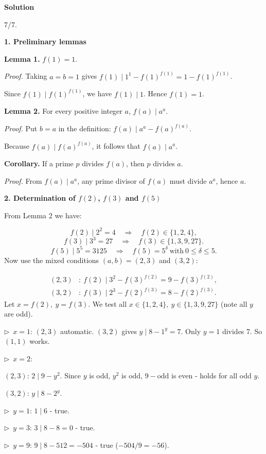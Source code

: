\documentclass{llmxive}
\providecommand{\solutionheading}[1]{\par\smallskip\noindent\textbf{#1}\par}
\providecommand{\compactbullet}[1]{\par\noindent$\triangleright$~#1\par}
\begin{document}
\solutionheading{Solution}
\begin{remark*}
  7/7.
\end{remark*}
\solutionheading{1. Preliminary lemmas}
\textbf{Lemma 1.} \(f(1)=1\).\par
\emph{Proof.} Taking \(a=b=1\) gives \(f(1)\mid 1^{1}-f(1)^{f(1)}=1-f(1)^{f(1)}\).\par
Since \(f(1)\mid f(1)^{f(1)}\), we have \(f(1)\mid 1\). Hence \(f(1)=1\).\par
\textbf{Lemma 2.} For every positive integer \(a\), \(f(a)\mid a^{a}\).\par
\emph{Proof.} Put \(b=a\) in the definition: \(f(a)\mid a^{a}-f(a)^{f(a)}\).\par
Because \(f(a)\mid f(a)^{f(a)}\), it follows that \(f(a)\mid a^{a}\).\par
\textbf{Corollary.} If a prime \(p\) divides \(f(a)\), then \(p\) divides \(a\).\par
\emph{Proof.} From \(f(a)\mid a^{a}\), any prime divisor of \(f(a)\) must divide \(a^{a}\), hence \(a\).\par
\smallskip
\solutionheading{2. Determination of \(f(2)\), \(f(3)\) and \(f(5)\)}
From Lemma 2 we have:\par
\[
f(2)\mid 2^{2}=4\quad\Longrightarrow\quad f(2)\in\{1,2,4\},
\]
\[
f(3)\mid 3^{3}=27\quad\Longrightarrow\quad f(3)\in\{1,3,9,27\}.
\]
\[
f(5)\mid 5^{5}=3125\quad\Longrightarrow\quad f(5)=5^{\delta}\ \text{with}\ 0\le\delta\le 5.
\]
Now use the mixed conditions \((a,b)=(2,3)\) and \((3,2)\):\par
\[
\begin{aligned}
(2,3)&:\ f(2)\mid 3^{2}-f(3)^{f(2)}=9-f(3)^{f(2)},\\
(3,2)&:\ f(3)\mid 2^{3}-f(2)^{f(3)}=8-f(2)^{f(3)}.
\end{aligned}
\]
Let \(x=f(2),\ y=f(3)\). We test all \(x\in\{1,2,4\},\ y\in\{1,3,9,27\}\) (note all \(y\) are odd).\par
\compactbullet{\textbf{}\(x=1\):\textbf{ }\((2,3)\) automatic. \((3,2)\) gives \(y\mid 8-1^{y}=7\). Only \(y=1\) divides 7. So \((1,1)\) works.}
\compactbullet{\textbf{}\(x=2\):\textbf{}}
\((2,3)\): \(2\mid 9-y^{2}\). Since \(y\) is odd, \(y^{2}\) is odd, \(9-\text{odd}\) is even - holds for all odd \(y\).\par
\((3,2)\): \(y\mid 8-2^{y}\).\par
\compactbullet{\(y=1\): \(1\mid6\) - true.}
\compactbullet{\(y=3\): \(3\mid 8-8=0\) - true.}
\compactbullet{\(y=9\): \(9\mid 8-512=-504\) - true (\(-504/9=-56\)).}
\end{document}
